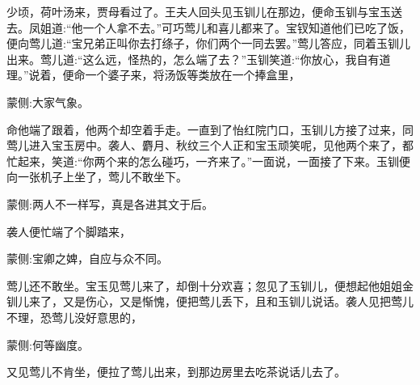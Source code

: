 \begin{parag}
    少顷，荷叶汤来，贾母看过了。王夫人回头见玉钏儿在那边，便命玉钏与宝玉送去。凤姐道:“他一个人拿不去。”可巧莺儿和喜儿都来了。宝钗知道他们已吃了饭，便向莺儿道:“宝兄弟正叫你去打绦子，你们两个一同去罢。”莺儿答应，同着玉钏儿出来。莺儿道:“这么远，怪热的，怎么端了去？”玉钏笑道:“你放心，我自有道理。”说着，便命一个婆子来，将汤饭等类放在一个捧盒里，\begin{note}蒙侧:大家气象。\end{note}命他端了跟着，他两个却空着手走。一直到了怡红院门口，玉钏儿方接了过来，同莺儿进入宝玉房中。袭人、麝月、秋纹三个人正和宝玉顽笑呢，见他两个来了，都忙起来，笑道:“你两个来的怎么碰巧，一齐来了。”一面说，一面接了下来。玉钏便向一张机子上坐了，莺儿不敢坐下。\begin{note}蒙侧:两人不一样写，真是各进其文于后。\end{note}袭人便忙端了个脚踏来，\begin{note}蒙侧:宝卿之婢，自应与众不同。\end{note}莺儿还不敢坐。宝玉见莺儿来了，却倒十分欢喜；忽见了玉钏儿，便想起他姐姐金钏儿来了，又是伤心，又是惭愧，便把莺儿丢下，且和玉钏儿说话。袭人见把莺儿不理，恐莺儿没好意思的，\begin{note}蒙侧:何等幽度。\end{note}又见莺儿不肯坐，便拉了莺儿出来，到那边房里去吃茶说话儿去了。
\end{parag}


